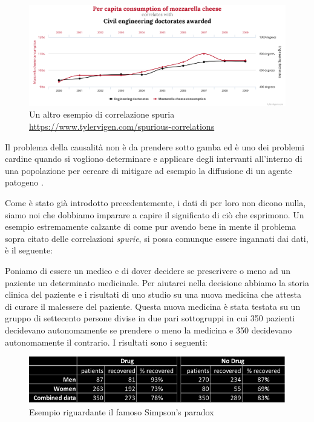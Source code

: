 \begin{figure}[h]
    \begin{center}
        \includegraphics[width=\linewidth]{img/chart1.png}
        \caption{Un altro esempio di correlazione spuria
        \url{https://www.tylervigen.com/spurious-correlations}}
        \label{fig:another_spurious_relations}
    \end{center}
\end{figure}

\newpage

Il problema della causalità non è da prendere sotto gamba
ed è uno dei problemi cardine quando si vogliono determinare e 
applicare degli intervanti all'interno di una popolazione per
cercare di mitigare ad esempio la diffusione di un agente 
patogeno \cite{Parascandola2001-kw}. 

Come è stato già introdotto precedentemente, i dati di per loro
non dicono nulla, siamo noi che dobbiamo imparare a 
capire il significato di ciò che esprimono. Un esempio 
estremamente calzante di come pur avendo bene in mente il
problema sopra citato delle correlazioni \emph{spurie}, si
possa comunque essere ingannati dai dati, è il seguente:

Poniamo di essere un medico e di dover decidere se 
prescrivere o meno ad un paziente un determinato medicinale.
Per aiutarci nella decisione abbiamo la storia clinica
del paziente e i risultati di uno studio su una nuova 
medicina che attesta di curare il malessere del paziente.
Questa nuova medicina è stata testata su un gruppo di 
settecento persone divise in due pari sottogruppi in cui 
350 pazienti decidevano autonomamente se prendere o meno 
la medicina e 350 decidevano autonomamente il contrario.
I risultati sono i seguenti:

\begin{figure}[h]
    \begin{center}
        \includegraphics[width=\linewidth]{img/simpson.png}
        \caption{Esempio riguardante il famoso Simpson's paradox}
        \label{fig:simpson_paradox}
    \end{center}
\end{figure}

